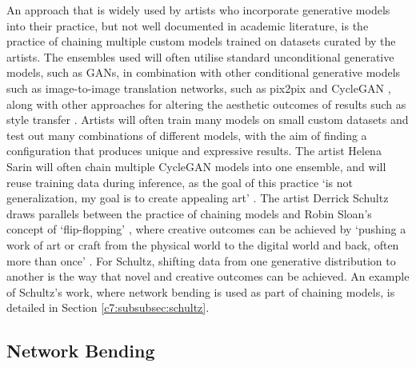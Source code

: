 An approach that is widely used by artists who incorporate generative models into their practice, but not well documented in academic literature, is the practice of chaining multiple custom models trained on datasets curated by the artists. 
The ensembles used will often utilise standard unconditional generative models, such as GANs, in combination with other conditional generative models such as image-to-image translation networks, such as pix2pix \citep{isola2017image} and CycleGAN \citep{zhu2017unpaired}, along with other approaches for altering the aesthetic outcomes of results such as style transfer \citep{gatys2016neural}. 
Artists will often train many models on small custom datasets and test out many combinations of different models, with the aim of finding a configuration that produces unique and expressive results. 
The artist Helena Sarin will often chain multiple CycleGAN models into one ensemble, and will reuse training data during inference, as the goal of this practice `is not generalization, my goal is to create appealing art' \citep{sarin2018playing}. 
The artist Derrick Schultz draws parallels between the practice of chaining models and Robin Sloan's concept of `flip-flopping' \citep{schultz2021personal}, where creative outcomes can be achieved by `pushing a work of art or craft from the physical world to the digital world and back, often more than once' \citep{sloan2012flipflop}. 
For Schultz, shifting data from one generative distribution to another is the way that novel and creative outcomes can be achieved. 
An example of Schultz's work, where network bending is used as part of chaining models, is detailed in Section \ref{c7:subsubsec:schultz}.


\subsection{Network Bending}
\label{survey:bending}

